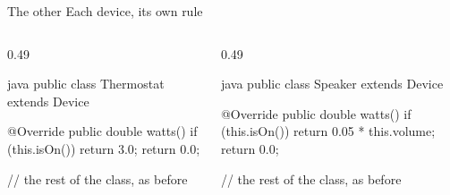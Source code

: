 \documentclass[\deckoptions]{beamer}
\begin{document}
\begin{frame}[fragile]{The other }{Each device, its own rule}
  \begin{columns}[T, onlytextwidth]
    \begin{column}{0.49\textwidth}
\begin{codeblock}[compact]{java}
public class Thermostat extends Device {
    @Override
    public double watts() {
        if (this.isOn()) {
            return 3.0;
        }
        return 0.0;
    }

    // the rest of the class, as before
}
\end{codeblock}
    \end{column}
    \begin{column}{0.49\textwidth}
\begin{codeblock}[compact]{java}
public class Speaker extends Device {
    @Override
    public double watts() {
        if (this.isOn()) {
            return 0.05 * this.volume;
        }
        return 0.0;
    }

    // the rest of the class, as before
}
\end{codeblock}
    \end{column}
  \end{columns}
\end{frame}
\end{document}
